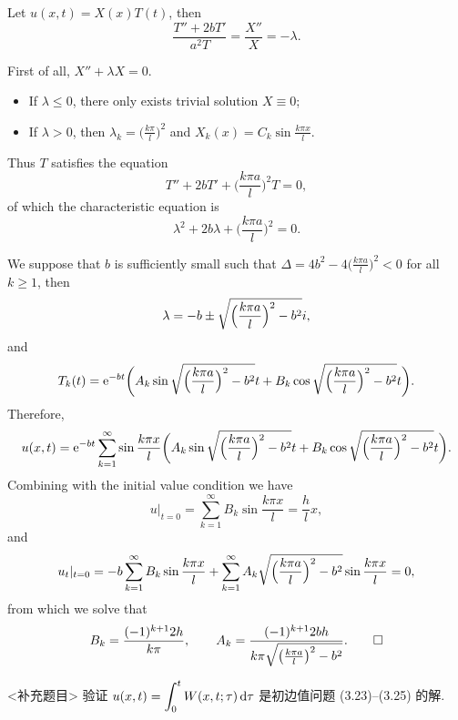 \begin{solution}
  Let $u(x,t) = X(x)T(t)$, then
  \[\frac{T''+2bT'}{a^2T} = \frac{X''}{X} = -\lambda. \]

  First of all, $X'' + \lambda X = 0$.
  \begin{itemize}
    \item If $\lambda\leq 0$, there only exists trivial solution $X\equiv 0$;
    \item If $\lambda>0$, then $\lambda_k = \bigl(\frac{k\pi}{l}\bigr)^2$
      and $X_k(x) = C_k\sin\frac{k\pi x}{l}$.
  \end{itemize}

  Thus $T$ satisfies the equation
  \[ T'' + 2bT' + \biggl(\frac{k\pi a}{l}\biggr)^2 T = 0, \]
  of which the characteristic equation is
  \[ \lambda^2 + 2b\lambda + \biggl(\frac{k\pi a}{l}\biggr)^2 = 0. \]

  We suppose that $b$ is sufficiently small such that
  $\Delta = 4b^2 - 4\bigl(\frac{k\pi a}{l}\bigr)^2 < 0$ for all $k\geq 1$, then
  \[\lambda = -b \pm \sqrt{\Bigl(\frac{k\pi a}{l}\Bigr)^2 - b^2}i, \]
  and
  \[ T_k(t) = \mathrm{e}^{-bt} \biggl(A_k \sin \sqrt{\Bigl(\frac{k\pi a}{l}\Bigr)^2 - b^2} t
    + B_k \cos \sqrt{\Bigl(\frac{k\pi a}{l}\Bigr)^2 - b^2} t\biggr). \]
  Therefore,
  \[ u(x,t) = \mathrm{e}^{-bt} \sum_{k=1}^\infty \sin\frac{k\pi x}{l}
      \biggl(A_k \sin \sqrt{\Bigl(\frac{k\pi a}{l}\Bigr)^2 - b^2} t
      + B_k \cos \sqrt{\Bigl(\frac{k\pi a}{l}\Bigr)^2 - b^2} t\biggr). \]
  Combining with the initial value condition we have
  \[u|_{t=0} = \sum_{k=1}^\infty B_k \sin\frac{k\pi x}{l} = \frac{h}{l}x, \]
  and
  \[u_t|_{t=0} = -b\sum_{k=1}^\infty B_k \sin\frac{k\pi x}{l}
    + \sum_{k=1}^\infty A_k \sqrt{\Bigl(\frac{k\pi a}{l}\Bigr)^2-b^2}
      \sin\frac{k\pi x}{l} = 0,\]
  from which we solve that
  \[ B_k = \frac{(-1)^{k+1}2h}{k\pi},\qquad
    A_k = \frac{(-1)^{k+1}2bh}{k\pi\sqrt{\bigl(\frac{k\pi a}{l}\bigr)^2-b^2}}. \qedhere \]
\end{solution}


\begin{exercise}[7]<补充题目>
  验证 $\displaystyle u(x,t) = \int_0^t W(x,t;\tau)\mathop{}\!\mathrm{d}\tau$ 是初边值问题 (3.23)--(3.25) 的解.
\end{exercise}

